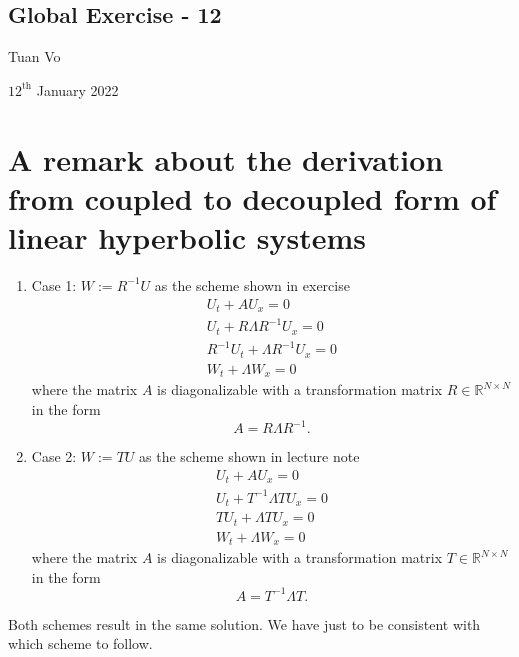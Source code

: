 \documentclass[12pt]{article}
\begin{document}
\begin{center}
	\section*{Global Exercise - 12}
\end{center}
\begin{center}
	Tuan Vo
\end{center}
\begin{center}
	$12^{\text{th}}$ January 2022
\end{center}
\section{A remark about the derivation from coupled to decoupled form of linear hyperbolic systems}
\begin{enumerate}
	\item Case 1: $W:=R^{-1}U$ as the scheme shown in exercise
	      \begin{equation*}
		      \boxed{
			      \begin{aligned}
				      U_{t} + AU_{x} = 0                     \\
				      U_{t} + R\Lambda R^{-1} U_{x} = 0      \\
				      R^{-1}U_{t} + \Lambda R^{-1} U_{x} = 0 \\
				      W_{t} + \Lambda W_{x} = 0                    
			      \end{aligned}
		      }
	      \end{equation*}
	      where the matrix $A$ is diagonalizable with a transformation matrix $R \in \mathbb{R}^{N\times N}$ in the form 
	      $$A=R\Lambda R^{-1}.$$
	      
	\item Case 2: $W:=TU$ as the scheme shown in lecture note
	      \begin{equation*}
		      \boxed{
			      \begin{aligned}
				      U_{t} + AU_{x} = 0                \\
				      U_{t} + T^{-1}\Lambda T U_{x} = 0 \\
				      TU_{t} + \Lambda TU_{x} = 0       \\
				      W_{t} + \Lambda W_{x} = 0                      
			      \end{aligned}
		      }
	      \end{equation*}
	      where the matrix $A$ is diagonalizable with a transformation matrix $T \in \mathbb{R}^{N\times N}$ in the form 
	      $$A= T^{-1} \Lambda T.$$
\end{enumerate}
Both schemes result in the same solution. We have just to be consistent with which scheme to follow.
\end{document}
